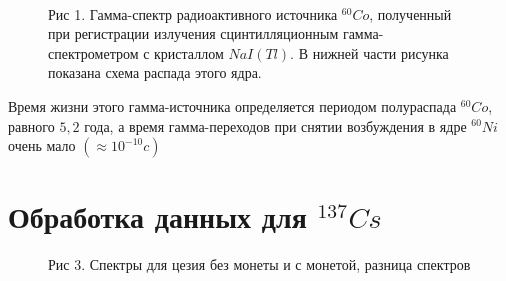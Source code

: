 \documentclass[12pt]{article}
\begin{document}
    \begin{figure}[h!]
      \begin{minipage}[h]{\linewidth}
        \\
        Рис 1. Гамма-спектр радиоактивного источника $^{60} Co$, полученный при
        регистрации излучения сцинтилляционным гамма-спектрометром с кристаллом
        $NaI(Tl)$. В нижней части рисунка показана схема распада этого ядра.
      \end{minipage}
      \label{chart:theory}
    \end{figure}

    Время жизни этого гамма-источника определяется периодом полураспада
    $^{60}Co$, равного $5,2$ года, а время гамма-переходов при снятии
    возбуждения в ядре $^{60}Ni$ очень мало $(\approx 10^{-10} c)$\\


  \newpage
  \section{Обработка данных для $^{137}Cs$}

    \begin{figure}[h!]
      \begin{minipage}[h]{\linewidth}
        Рис 3. Спектры для цезия без монеты и с монетой, разница спектров
      \end{minipage}
      \label{chart:cesium}
    \end{figure}
\end{document}
